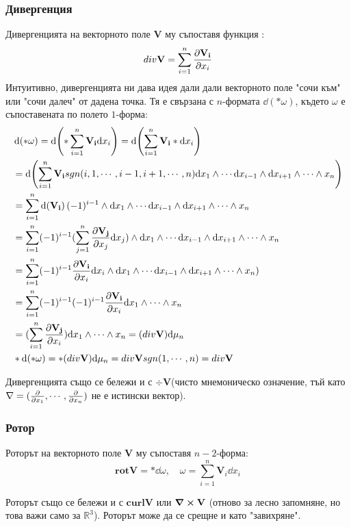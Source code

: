 \documentclass[12pt]{article}
\begin{document}
\begin{large}
\subsubsection*{Дивергенция}
Дивергенцията на векторното поле $\mathbf{V}$ му съпоставя функция :
\[
  div \mathbf{V} = \sum_{i=1}^{n} \pdv{\mathbf{V_i}}{x_i}
  \]
Интуитивно, дивергенцията ни дава идея дали дали векторното поле "сочи към" или "сочи далеч" от дадена точка. Тя е свързана с $n$-формата $\dd (\ast \omega)$, където $\omega$ е съпоставената по полето $1$-форма:
\begin{align*}
  &\dd (\ast \omega) = \dd ( \ast \sum_{i=1}^{n} \mathbf{V_i} \dd x_i ) = \dd( \sum_{i=1}^{n} \mathbf{V_i} \ast \dd x_i ) \\
  &= \dd(\sum_{i=1}^{n} \mathbf{V_i} sgn(i,1,\cdots,i-1,i+1,\cdots,n) \dd x_1 \wedge \cdots \dd x_{i-1} \wedge \dd x_{i+1} \wedge \cdots \wedge x_n) \\
  &=\sum_{i=1}^{n} \dd(\mathbf{V_i}) (-1)^{i-1} \wedge \dd x_1 \wedge \cdots \dd x_{i-1} \wedge \dd x_{i+1} \wedge \cdots \wedge x_n \\
  &=\sum_{i=1}^{n} (-1)^{i-1}  (\sum_{j=1}^{n} \pdv{\mathbf{V_j}}{x_j} \dd x_j ) \wedge \dd x_1 \wedge \cdots \dd x_{i-1} \wedge \dd x_{i+1} \wedge \cdots \wedge x_n \\
&=\sum_{i=1}^{n} (-1)^{i-1} \pdv{\mathbf{V_i}}{x_i} \dd x_i  \wedge \dd x_1 \wedge \cdots \dd x_{i-1} \wedge \dd x_{i+1} \wedge \cdots \wedge x_n) \\
&=\sum_{i=1}^{n} (-1)^{i-1}(-1)^{i-1} \pdv{\mathbf{V_i}}{x_i}  \dd x_1 \wedge \cdots \wedge x_n \\
&=(\sum_{i=1}^{n} \pdv{\mathbf{V_j}}{x_i})  \dd x_1 \wedge \cdots \wedge x_n = (div \mathbf{V}) \dd \mu_n \\
&\ast \dd (\ast \omega) = \ast (div \mathbf{V}) \dd \mu_n = div \mathbf{V} sgn(1,\cdots,n) = div \mathbf{V}
\end{align*}

Дивергенцията също се бележи и с $\div \mathbf{V}$(чисто мнемоническо означение, тъй като $\nabla=(\pdv{}{x_1},\cdots,\pdv{}{x_n})$ не е истински вектор).

\subsubsection*{Ротор}
Роторът на векторното поле $\mathbf{V}$ му съпоставя $n-2$-форма:
\[
\mathbf{rot} \mathbf{V} = \ast \dd \omega, \quad
\omega=\sum_{i=1}^n \mathbf{V}_i \dd x_i
\]

Роторът също се бележи и с $\mathbf{curl} \mathbf{V}$ или $\curl \mathbf{V}$ (отново за лесно запомняне, но това важи само за $\mathbb{R}^3$). Роторът може да се срещне и като "завихряне".


\end{large}
\end{document}
